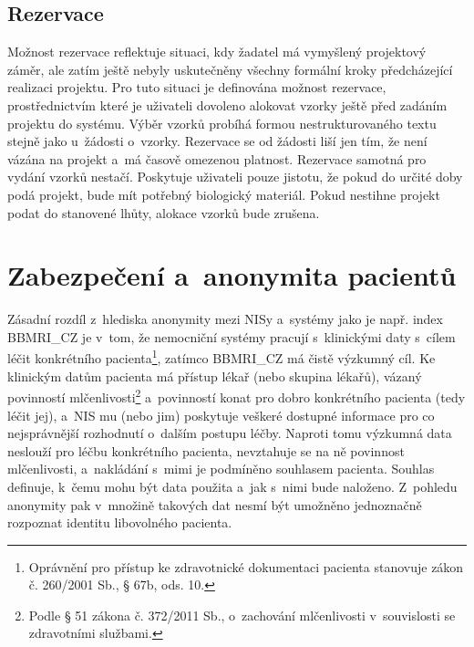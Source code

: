 \documentclass[11pt, final, oneside]{fithesis2}
\newcommand{\ProjectName}{\mbox{BBMRI\_CZ}\xspace}
\begin{document}
\subsection{Rezervace}
Možnost rezervace reflektuje situaci, kdy žadatel má vymyšlený projektový záměr, ale zatím ještě nebyly uskutečněny všechny formální kroky předcházející realizaci projektu. Pro tuto situaci je definována možnost rezervace, prostřednictvím které je uživateli dovoleno alokovat vzorky ještě před zadáním projektu do systému. Výběr vzorků probíhá formou nestrukturovaného textu stejně jako u~žádosti o~vzorky. Rezervace se od žádosti liší jen tím, že není vázána na projekt a~má časově omezenou platnost.
Rezervace samotná pro vydání vzorků nestačí. Poskytuje uživateli pouze jistotu, že pokud do určité doby podá projekt, bude mít potřebný biologický materiál. Pokud nestihne projekt podat do stanovené lhůty, alokace vzorků bude zrušena.

\section{Zabezpečení a~anonymita pacientů}
Zásadní rozdíl z~hlediska anonymity mezi NISy a~systémy jako je např. index \ProjectName je v~tom, že nemocniční systémy pracují s~klinickými daty s~cílem léčit konkrétního pacienta\footnote{Oprávnění pro přístup ke zdravotnické dokumentaci pacienta stanovuje zákon č. 260/2001 Sb., § 67b, ods. 10.}, zatímco \ProjectName má čistě výzkumný cíl. Ke klinickým datům pacienta má přístup lékař (nebo skupina lékařů), vázaný povinností mlčenlivosti\footnote{Podle § 51 zákona č. 372/2011 Sb., o~zachování mlčenlivosti v~souvislosti se zdravotními službami.} a~povinností konat pro dobro konkrétního pacienta (tedy léčit jej), a~NIS mu (nebo jim) poskytuje veškeré dostupné informace pro co nejsprávnější rozhodnutí o~dalším postupu léčby. Naproti tomu výzkumná data neslouží pro léčbu konkrétního pacienta, nevztahuje se na ně povinnost mlčenlivosti, a~nakládání s~mimi je podmíněno souhlasem pacienta. Souhlas definuje, k~čemu mohu být data použita a~jak s~nimi bude naloženo. Z~pohledu anonymity pak v~množině takových dat nesmí být umožněno jednoznačně rozpoznat identitu libovolného pacienta. 

\end{document}
